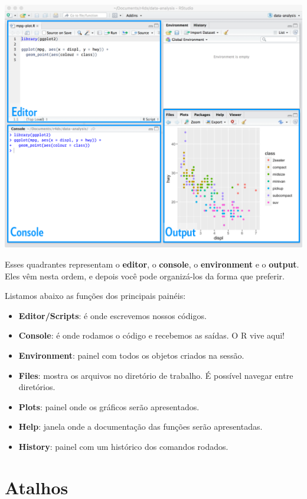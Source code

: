 \documentclass[
]{book}
\providecommand{\tightlist}{%
  \setlength{\itemsep}{0pt}\setlength{\parskip}{0pt}}
\begin{document}
\begin{center}\includegraphics[width=56.24in]{img/rstudio/rstudio-editor} \end{center}

Esses quadrantes representam o \textbf{editor}, o \textbf{console}, o \textbf{environment} e o \textbf{output}. Eles vêm nesta ordem, e depois você pode organizá-los da forma que preferir.

Listamos abaixo as funções dos principais painéis:

\begin{itemize}
\tightlist
\item
  \textbf{Editor/Scripts}: é onde escrevemos nossos códigos.
\item
  \textbf{Console}: é onde rodamos o código e recebemos as saídas. O R vive aqui!
\item
  \textbf{Environment}: painel com todos os objetos criados na sessão.
\item
  \textbf{Files}: mostra os arquivos no diretório de trabalho. É possível navegar entre diretórios.
\item
  \textbf{Plots}: painel onde os gráficos serão apresentados.
\item
  \textbf{Help}: janela onde a documentação das funções serão apresentadas.
\item
  \textbf{History}: painel com um histórico dos comandos rodados.
\end{itemize}

\hypertarget{atalhos}{%
\section{Atalhos}\label{atalhos}}
\end{document}
